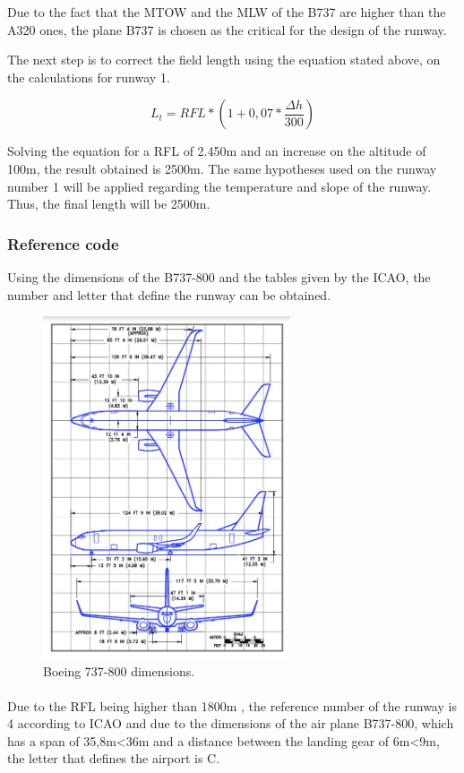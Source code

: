 		Due to the fact that the MTOW and the MLW of the B737 are higher than the A320 ones, the plane B737 is chosen as the critical for the design of the runway. 		
		
		The next step is to correct the field length using the equation stated above, on the calculations for runway 1. 
	
		\[L_t=RFL*(1+0,07*\frac{\Delta h}{300})\]
		
		Solving the equation for a RFL of 2.450m and an increase on the altitude of 100m, the result obtained is 2500m.
		The same hypotheses used on the runway number 1 will be applied regarding the temperature and slope of the runway.  Thus, the final length will be 2500m.
		
		\subsubsection{Reference code}
		Using the dimensions of the B737-800 and the tables given by the ICAO, the number and letter that define the runway can be obtained. 
		
		\begin{figure}[H]
			\centering
			\includegraphics[clip, trim=0cm 0cm 0cm 0cm, width=0.65\textwidth]{./images/B737/737}
			\caption{Boeing 737-800 dimensions.} %
			\label{} %
		\end{figure}
	
		\paragraph{}Due to the RFL being higher than 1800m , the reference number of the runway is 4 according to ICAO and due to the dimensions of the air plane B737-800, which has a span of 35,8m<36m and a distance between the landing gear of 6m<9m, the letter that defines the airport is C.
	
